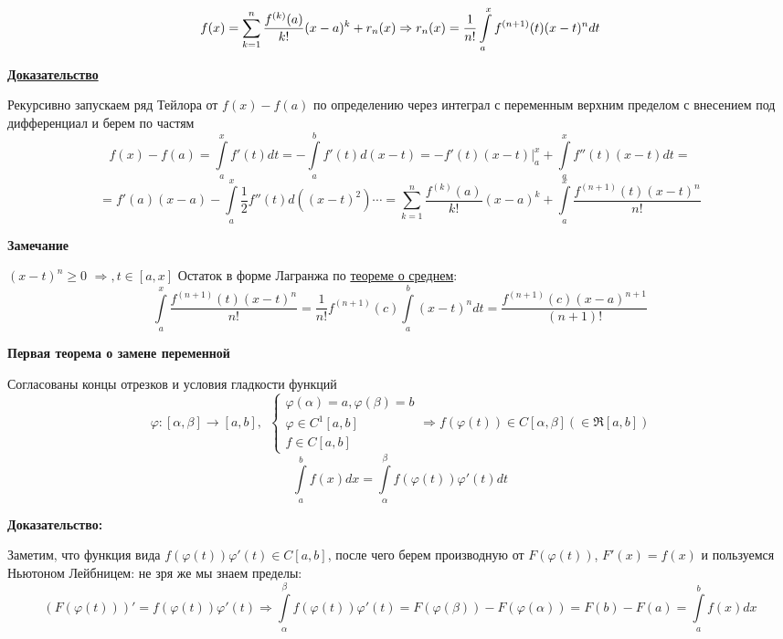 \documentclass[a4paper,11pt]{article}
\renewcommand{\phi}{\ensuremath{\varphi}}
\newcommand{\Theorem}[3]{ 
\noindent\makebox[\linewidth]{\rule{\textwidth}{2pt}}

\noindent \textbf{#1} 
 
 #2
 
 \noindent\makebox[\linewidth]{\rule{\textwidth}{2pt}}
 \noindent \textbf{Доказательство:}
 
 #3
 
 \noindent\makebox[\linewidth]{\rule{\textwidth}{2pt}}
 }
\newcommand{\formula}[1]{
\begin{myquote} 
	\centering
	\begin{equation}
	{#1}
	\end{equation}
\end{myquote}
 }
\newcommand{\ubf}[1]{ \noindent\textbf{\underline{#1}}}
\newcommand{\Sum}{\sum\limits_{k = 1}^n}
\begin{document}
\formula{ \label{eq:reint}
f(x) = \Sum \dfrac{f^{(k)}(a)}{k!}(x-a)^k + r_n(x) \Rightarrow r_n(x) = \dfrac{1}{n!} \int\limits_a^x f^{(n+1)}(t)(x-t)^ndt
}

\ubf{Доказательство}

Рекурсивно запускаем ряд Тейлора от $f(x) - f(a)$  по определению через интеграл с переменным верхним пределом с внесением под дифференциал и берем по частям
\[
f(x) - f(a) = \int\limits_a^x f'(t)dt = - \int\limits_a^b f'(t)d(x - t) = -f'(t)(x-t) \bigg|_a^x + \int\limits_a^x f''(t)(x-t)dt =
\]
\[
=f'(a)(x-a) -\int\limits_a^x \dfrac{1}{2} f''(t)d((x-t)^2) \cdots = \Sum \dfrac{f^{(k)}(a)}{k!}(x-a)^k + \int\limits_a^x \dfrac{f^{(n+1)}(t)(x-t)^n}{n!}
\]

\textbf{Замечание }

$(x-t)^n \geq 0$ $\Rightarrow, t \in [a, x]$ Остаток в форме Лагранжа по \hyperref[Th:firstaverage]{теореме о среднем}:
\[
\int\limits_a^x \dfrac{f^{(n+1)}(t)(x-t)^n}{n!} = \dfrac{1}{n!} f^{(n+1)}(c) \int\limits_a^b (x-t)^n dt = \dfrac{f^{(n+1)}(c)(x-a)^{n+1}}{(n+1)!}
\]

\Theorem
{Первая теорема о замене переменной}
{
Согласованы концы отрезков и условия гладкости функций 
\[
\phi: [\alpha, \beta] \to [a, b], \ \ 
\begin{cases}
\phi(\alpha) = a, \phi(\beta) = b \\
\phi \in C^1[a, b] \\
f \in C[a, b]
\end{cases}
\Rightarrow f(\phi(t)) \in C[\alpha, \beta] (\in \Re[a, b])
\]
\[
\int\limits_a^b f(x)dx = \int\limits_{\alpha}^{\beta} f(\phi(t)) \phi'(t)dt
\]
}
{
Заметим, что функция вида $f(\phi(t))\phi'(t) \in C[a, b]$, после чего берем производную от $F(\phi(t))$, $F'(x) = f(x)$ и пользуемся Ньютоном Лейбницем: не зря же мы знаем пределы:
\[
(F(\phi(t)))'=f(\phi(t))\phi'(t) \Rightarrow \int\limits_{\alpha}^{\beta} f(\phi(t))\phi'(t) = F(\phi(\beta)) - F(\phi(\alpha)) = F(b) - F(a) = \int\limits_a^b f(x)dx
 \]
}
\end{document}

